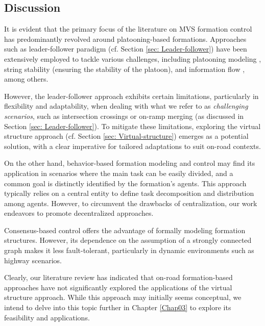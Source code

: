 \subsection{Discussion} \label{sec: Disc_formation_approach}

It is evident that the primary focus of the literature on MVS formation control has predominantly revolved around platooning-based formations. Approaches such as leader-follower paradigm (cf. Section \ref{sec: Leader-follower}) have been extensively employed to tackle various challenges, including platooning modeling \cite{li2022platoon}, string stability (ensuring the stability of the platoon)\cite{feng2019string}, and information flow \cite{ren2008distributed}, among others. 

However, the leader-follower approach exhibits certain limitations, particularly in flexibility and adaptability, when dealing with what we refer to as \textit{challenging scenarios}, such as intersection crossings or on-ramp merging (as discussed in Section \ref{sec: Leader-follower}). To mitigate these limitations, exploring the virtual structure approach (cf. Section \ref{sec: Virtual-structure}) emerges as a potential solution, with a clear imperative for tailored adaptations to suit on-road contexts. 

On the other hand, behavior-based formation modeling and control may find its application in scenarios where the main task can be easily divided, and a common goal is distinctly identified by the formation's agents. This approach typically relies on a central entity to define task decomposition and distribution among agents. However, to circumvent the drawbacks of centralization, our work endeavors to promote decentralized approaches. 

Consensus-based control offers the advantage of formally modeling formation structures. However, its dependence on the assumption of a strongly connected graph makes it less fault-tolerant, particularly in dynamic environments such as highway scenarios. 

Clearly, our literature review has indicated that on-road formation-based approaches have not significantly explored the applications of the virtual structure approach. While this approach may initially seems conceptual, we intend to delve into this topic further in Chapter \ref{Chap03} to explore its feasibility and applications. 



